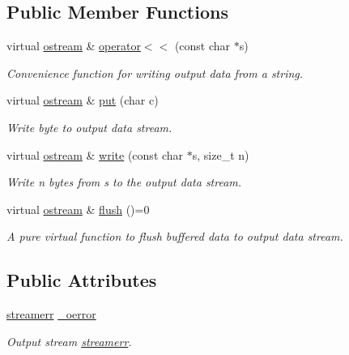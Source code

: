 \subsection*{Public Member Functions}
\begin{DoxyCompactItemize}
\item 
virtual \hyperlink{classuio_1_1ostream}{ostream} \& \hyperlink{classuio_1_1ostream_a9997cc4d79bc6019fe554efe188f923e}{operator$<$$<$} (const char $\ast$s)
\begin{DoxyCompactList}\small\item\em Convenience function for writing output data from a {\ttfamily string}. \end{DoxyCompactList}\item 
virtual \hyperlink{classuio_1_1ostream}{ostream} \& \hyperlink{classuio_1_1ostream_aeffd1b2ee0a79a6728840811c7ad1770}{put} (char c)
\begin{DoxyCompactList}\small\item\em Write byte to output data stream. \end{DoxyCompactList}\item 
virtual \hyperlink{classuio_1_1ostream}{ostream} \& \hyperlink{classuio_1_1ostream_a4da5a561a3547e3a3793618860182354}{write} (const char $\ast$s, size\+\_\+t n)
\begin{DoxyCompactList}\small\item\em Write {\itshape n} bytes from {\itshape s} to the output data stream. \end{DoxyCompactList}\item 
virtual \hyperlink{classuio_1_1ostream}{ostream} \& \hyperlink{classuio_1_1ostream_a8c398c36b7619aa7cf32da064bce64d3}{flush} ()=0
\begin{DoxyCompactList}\small\item\em A pure virtual function to flush buffered data to output data stream. \end{DoxyCompactList}\end{DoxyCompactItemize}
\subsection*{Public Attributes}
\begin{DoxyCompactItemize}
\item 
\hyperlink{classuio_1_1streamerr}{streamerr} \hyperlink{classuio_1_1ostream_aaba80028bfff5f9d12f40789db0c8d58}{\+\_\+oerror}\hypertarget{classuio_1_1ostream_aaba80028bfff5f9d12f40789db0c8d58}{}\label{classuio_1_1ostream_aaba80028bfff5f9d12f40789db0c8d58}

\begin{DoxyCompactList}\small\item\em Output stream \hyperlink{classuio_1_1streamerr}{streamerr}. \end{DoxyCompactList}\end{DoxyCompactItemize}
